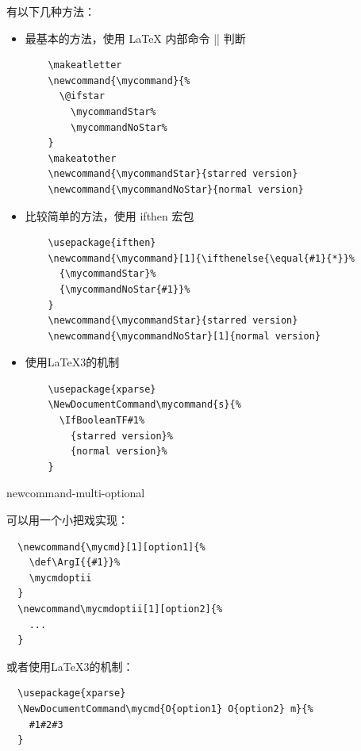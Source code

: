 




有以下几种方法：
\begin{itemize}
  \item 最基本的方法，使用 \LaTeX{} 内部命令 |\@ifstar| 判断
  \begin{verbatim}
    \makeatletter
    \newcommand{\mycommand}{%
      \@ifstar
        \mycommandStar%
        \mycommandNoStar%
    }
    \makeatother
    \newcommand{\mycommandStar}{starred version}
    \newcommand{\mycommandNoStar}{normal version}
  \end{verbatim}
  \item 比较简单的方法，使用 ifthen 宏包
  \begin{verbatim}
    \usepackage{ifthen}
    \newcommand{\mycommand}[1]{\ifthenelse{\equal{#1}{*}}%
      {\mycommandStar}%
      {\mycommandNoStar{#1}}%
    }
    \newcommand{\mycommandStar}{starred version}
    \newcommand{\mycommandNoStar}[1]{normal version}  
  \end{verbatim}
  \item 使用\LaTeX{3}的机制
  \begin{verbatim}
    \usepackage{xparse}
    \NewDocumentCommand\mycommand{s}{%
      \IfBooleanTF#1%
        {starred version}%
        {normal version}%
    }
  \end{verbatim}
\end{itemize}




{newcommand-multi-optional}

可以用一个小把戏实现：
\begin{verbatim}
  \newcommand{\mycmd}[1][option1]{%
    \def\ArgI{{#1}}%
    \mycmdoptii
  }
  \newcommand\mycmdoptii[1][option2]{%
    ...
  }
\end{verbatim}

或者使用\LaTeX{3}的机制：
\begin{verbatim}
  \usepackage{xparse}
  \NewDocumentCommand\mycmd{O{option1} O{option2} m}{%
    #1#2#3
  }
\end{verbatim}


